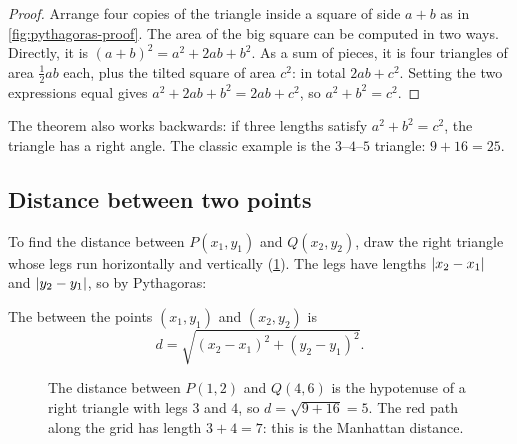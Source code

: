 \begin{proof}
Arrange four copies of the triangle inside a square of side $a + b$ as in
\cref{fig:pythagoras-proof}. The area of the big square can be computed in two
ways. Directly, it is $(a + b)^2 = a^2 + 2ab + b^2$. As a sum of pieces, it is
four triangles of area $\tfrac12ab$ each, plus the tilted square of area
$c^2$: in total $2ab + c^2$. Setting the two expressions equal gives
$a^2 + 2ab + b^2 = 2ab + c^2$, so $a^2 + b^2 = c^2$.
\end{proof}

The theorem also works backwards: if three lengths satisfy $a^2 + b^2 = c^2$,
the triangle has a right angle. The classic example is the $3$--$4$--$5$
triangle: $9 + 16 = 25$.

\subsection{Distance between two points}

To find the distance between $P(x_1, y_1)$ and $Q(x_2, y_2)$, draw the right
triangle whose legs run horizontally and vertically
(\cref{fig:distance}). The legs have lengths $\lvert x_2 - x_1\rvert$ and
$\lvert y_2 - y_1\rvert$, so by Pythagoras:

\begin{definition}\label{def:distance-2d}
The  between the points $(x_1, y_1)$ and $(x_2, y_2)$ is
\[
  d = \sqrt{(x_2 - x_1)^2 + (y_2 - y_1)^2} .
\]
\end{definition}

\begin{figure}[htbp]
\centering
{}
\caption{The distance between $P(1,2)$ and $Q(4,6)$ is the hypotenuse of a
  right triangle with legs $3$ and $4$, so $d = \sqrt{9 + 16} = 5$. The red
  path along the grid has length $3 + 4 = 7$: this is the Manhattan distance.}
\label{fig:distance}
\end{figure}

